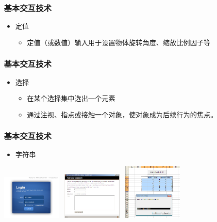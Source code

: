 \documentclass{beamer}
\newcommand{\fullPageImage}[2]{
	{
		\usebackgroundtemplate{\texttt{[image: \#1]}}
		\frame[plain]{#2}
	}
}
\begin{document}
\fullPageImage{images/Blender-tutorial_5.png}{\transwipe}

\begin{frame}
	\frametitle{基本交互技术}
	\beamertemplatetransparentcovereddynamicmedium
	\begin{itemize}[<+->]
		\item 定值
		\begin{itemize}
			\item 定值（或数值）输入用于设置物体旋转角度、缩放比例因子等
		\end{itemize}
	\end{itemize}
\end{frame}

\fullPageImage{images/Blender-tutorial_4.png}{\transwipe}

\begin{frame}
	\frametitle{基本交互技术}
	\beamertemplatetransparentcovereddynamicmedium
	\begin{itemize}[<+->]
		\item 选择
		\begin{itemize}
			\item 在某个选择集中选出一个元素
			\item 通过注视、指点或接触一个对象，使对象成为后续行为的焦点。
		\end{itemize}
	\end{itemize}
\end{frame}

\fullPageImage{images/Blender-tutorial_6.png}{\transwipe}

\begin{frame}
	\frametitle{基本交互技术}
	\begin{itemize}
		\item 字符串
	\end{itemize}\pause
	\begin{center}
	\includegraphics[width=3cm]{images/text-input-1.jpg}~\pause
	\includegraphics[width=3cm]{images/text-input-2.jpg}~\pause
	\includegraphics[width=3cm]{images/text-input-3.png}
	\end{center}
\end{frame}
\end{document}
